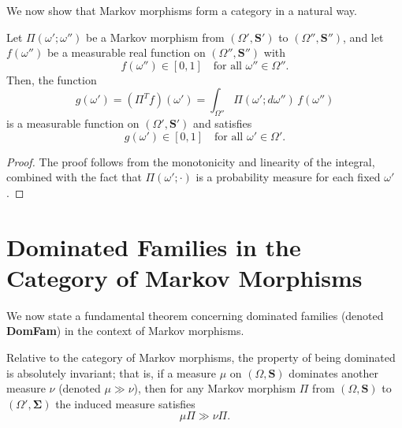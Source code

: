 We now show that Markov morphisms form a category in a natural way.

\begin{lemma}
Let $\Pi(\omega';\omega'')$ be a Markov morphism from $(\Omega', \mathbf{S}')$ to $(\Omega'', \mathbf{S}'')$, and let $f(\omega'')$ be a measurable real function on $(\Omega'', \mathbf{S}'')$ with 
\[
f(\omega'') \in [0,1] \quad \text{for all } \omega'' \in \Omega''.
\]
Then, the function 
\[
g(\omega') = (\Pi^T f)(\omega') = \int_{\Omega''} \Pi(\omega'; d\omega'') \, f(\omega'')
\]
is a measurable function on $(\Omega', \mathbf{S}')$ and satisfies 
\[
g(\omega') \in [0,1] \quad \text{for all } \omega' \in \Omega'.
\]
\end{lemma}

\begin{proof}
The proof follows from the monotonicity and linearity of the integral, combined with the fact that $\Pi(\omega'; \cdot)$ is a probability measure for each fixed $\omega'$.
\end{proof}



\section{Dominated Families in the Category of Markov Morphisms}

We now state a fundamental theorem concerning dominated families (denoted \textbf{DomFam}) in the context of Markov morphisms.

\begin{theorem}
Relative to the category of Markov morphisms, the property of being dominated is absolutely invariant; that is, if a measure $\mu$ on $(\Omega, \mathbf{S})$ dominates another measure $\nu$ (denoted $\mu \gg \nu$), then for any Markov morphism $\Pi$ from $(\Omega,\mathbf{S})$ to $(\Omega',\mathbf{\Sigma})$ the induced measure satisfies 
\[
\mu\Pi \gg \nu\Pi.
\]
\end{theorem}

